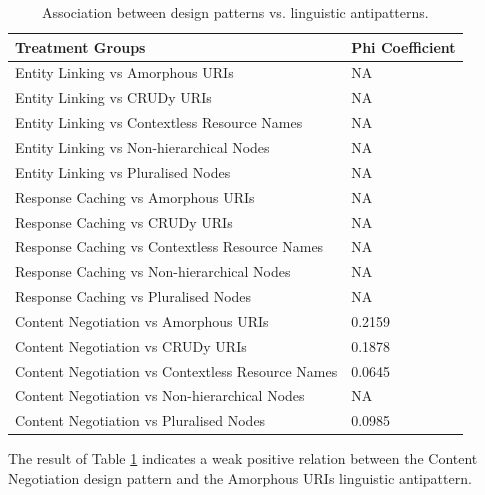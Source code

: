 \begin{table}[ht!]
    \centering
    \small
  \begin{tabular}{|l|l|}
\hline \textbf{Treatment Groups} & \textbf{Phi Coefficient} 
\\ \hline 
Entity Linking vs Amorphous URIs & NA
\\ \hline 
Entity Linking vs CRUDy URIs & NA
\\ \hline 
Entity Linking vs Contextless Resource Names & NA
\\ \hline 
Entity Linking vs Non-hierarchical Nodes & NA
\\ \hline 
Entity Linking vs Pluralised Nodes & NA
\\ \hline
Response Caching vs Amorphous URIs & NA
\\ \hline 
Response Caching vs CRUDy URIs & NA
\\ \hline 
Response Caching vs Contextless Resource Names & NA
\\ \hline 
Response Caching vs Non-hierarchical Nodes & NA
\\ \hline 
Response Caching vs Pluralised Nodes & NA
\\ \hline
Content Negotiation vs Amorphous URIs & 0.2159
\\ \hline 
Content Negotiation vs CRUDy URIs & 0.1878
\\ \hline 
Content Negotiation vs Contextless Resource Names & 0.0645
\\ \hline 
Content Negotiation vs Non-hierarchical Nodes & NA
\\ \hline 
Content Negotiation vs Pluralised Nodes & 0.0985
\\ \hline 
  \end{tabular}
    \caption{Association between design patterns vs. linguistic antipatterns.}
    \label{tab:Designpatternsvslinguisticantipatterns}
\end{table}

The result of Table \ref{tab:Designpatternsvslinguisticantipatterns} indicates a weak positive relation between the  Content Negotiation design pattern and the  Amorphous URIs linguistic antipattern.

\clearpage
\newpage